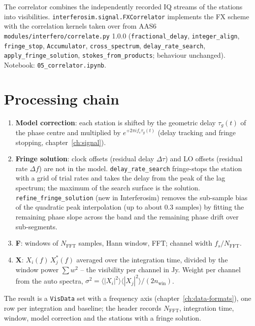 \label{ch:correlator}

The correlator combines the independently recorded IQ streams of the
stations into visibilities. \texttt{interferosim.signal.FXCorrelator}
implements the FX scheme with the correlation kernels taken over from AAS6
\texttt{modules/interfero/correlate.py} 1.0.0 (\texttt{fractional\_delay},
\texttt{integer\_align}, \texttt{fringe\_stop}, \texttt{Accumulator},
\texttt{cross\_spectrum}, \texttt{delay\_rate\_search},
\texttt{apply\_fringe\_solution}, \texttt{stokes\_from\_products}; behaviour
unchanged). Notebook: \texttt{05\_correlator.ipynb}.

\section{Processing chain}

\begin{enumerate}
  \item \textbf{Model correction}: each station is shifted by the geometric
        delay $\tau_g(t)$ of the phase centre and multiplied by
        $e^{+2\pi i f_c\tau_g(t)}$ (delay tracking and fringe stopping,
        chapter~\ref{ch:signal}).
  \item \textbf{Fringe solution}: clock offsets (residual delay
        $\Delta\tau$) and LO offsets (residual rate $\Delta f$) are not in the
        model. \texttt{delay\_rate\_search} fringe-stops the station with a
        grid of trial rates and takes the delay from the peak of the lag
        spectrum; the maximum of the search surface is the solution.
        \texttt{refine\_fringe\_solution} (new in Interferosim) removes the
        sub-sample bias of the quadratic peak interpolation (up to about
        0.3 samples) by fitting the remaining phase slope across the band
        and the remaining phase drift over sub-segments.
  \item \textbf{F}: windows of $N_\mathrm{FFT}$ samples, Hann window, FFT;
        channel width $f_s/N_\mathrm{FFT}$.
  \item \textbf{X}: $X_i(f)\,X_j^*(f)$ averaged over the integration time,
        divided by the window power $\sum w^2$ -- the visibility per channel
        in Jy. Weight per channel from the auto spectra,
        $\sigma^2 = \langle|X_i|^2\rangle\langle|X_j|^2\rangle/(2n_\mathrm{win})$.
\end{enumerate}
The result is a \texttt{VisData} set with a frequency axis
(chapter~\ref{ch:data-formats}), one row per integration and baseline; the
header records $N_\mathrm{FFT}$, integration time, window, model correction
and the stations with a fringe solution.

